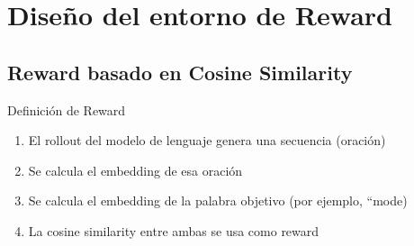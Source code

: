 \section{Diseño del entorno de Reward}
\subsection{Reward basado en Cosine Similarity}
\begin{importantbox}{Definición de Reward}
\begin{enumerate}
  \item El rollout del modelo de lenguaje genera una secuencia (oración)
  \item Se calcula el embedding de esa oración
  \item Se calcula el embedding de la palabra objetivo (por ejemplo, ``mode)
  \item La cosine similarity entre ambas se usa como reward
\end{enumerate}
\end{importantbox}

